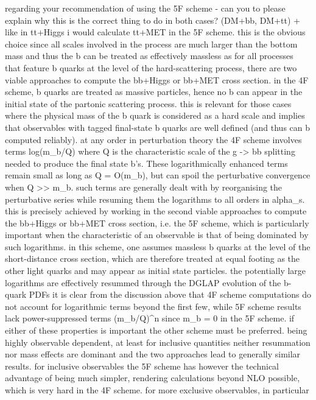 regarding your recommendation of using the 5F scheme - can you to please
explain why this is the correct thing to do in both cases? (DM+bb,
DM+tt) + like in tt+Higgs i would calculate tt+MET in the 5F scheme.
this is the obvious choice since all scales involved in the process are
much larger than the bottom mass and thus the b can be treated as
effectively massless as for all processes that feature b quarks at the
level of the hard-scattering process, there are two viable approaches to
compute the bb+Higgs or bb+MET cross section. in the 4F scheme, b quarks
are treated as massive particles, hence no b can appear in the initial
state of the partonic scattering process. this is relevant for those
cases where the physical mass of the b quark is considered as a hard
scale and implies that observables with tagged final-state b quarks are
well defined (and thus can b computed reliably). at any order in
perturbation theory the 4F scheme involves terms log(m\_b/Q) where Q is
the characteristic scale of the g -\textgreater{} bb splitting needed to
produce the final state b's. These logarithmically enhanced terms remain
small as long as Q = O(m\_b), but can spoil the perturbative convergence
when Q \textgreater{}\textgreater{} m\_b. such terms are generally dealt
with by reorganising the perturbative series while resuming them the
logarithms to all orders in alpha\_s. this is precisely achieved by
working in the second viable approaches to compute the bb+Higgs or
bb+MET cross section, i.e. the 5F scheme, which is particularly
important when the characteristic of an observable is that of being
dominated by such logarithms. in this scheme, one assumes massless b
quarks at the level of the short-distance cross section, which are
therefore treated at equal footing as the other light quarks and may
appear as initial state particles. the potentially large logarithms are
effectively resummed through the DGLAP evolution of the b-quark PDFs it
is clear from the discussion above that 4F scheme computations do not
account for logarithmic terms beyond the first few, while 5F scheme
results lack power-suppressed terms (m\_b/Q)\^{}n since m\_b = 0 in the
5F scheme. if either of these properties is important the other scheme
must be preferred. being highly observable dependent, at least for
inclusive quantities neither resummation nor mass effects are dominant
and the two approaches lead to generally similar results. for inclusive
observables the 5F scheme has however the technical advantage of being
much simpler, rendering calculations beyond NLO possible, which is very
hard in the 4F scheme. for more exclusive observables, in particular

